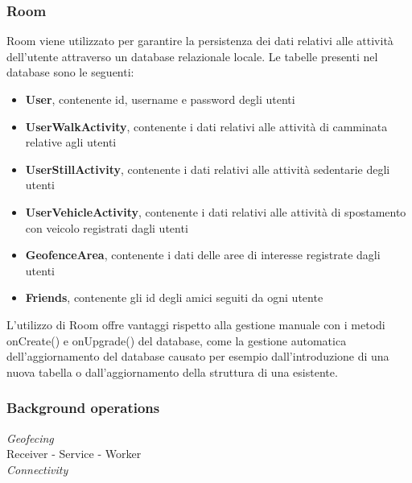 \documentclass{article}
\begin{document}
\subsubsection*{Room}
Room viene utilizzato per garantire la persistenza dei dati relativi alle attività dell'utente attraverso un database relazionale locale. Le tabelle presenti nel database sono le seguenti:
\begin{itemize}
    \renewcommand{\labelitemi}{-}
    \item \textbf{User}, contenente id, username e password degli utenti
    \item \textbf{UserWalkActivity}, contenente i dati relativi alle attività di camminata relative agli utenti
    \item \textbf{UserStillActivity}, contenente i dati relativi alle attività sedentarie degli utenti
    \item \textbf{UserVehicleActivity}, contenente i dati relativi alle attività di spostamento con veicolo registrati dagli utenti
    \item \textbf{GeofenceArea}, contenente i dati delle aree di interesse registrate dagli utenti
    \item \textbf{Friends}, contenente gli id degli amici seguiti da ogni utente
\end{itemize}
L'utilizzo di Room offre vantaggi rispetto alla gestione manuale con i metodi onCreate() e onUpgrade() del database, come la gestione automatica dell'aggiornamento del database causato per esempio dall'introduzione di una nuova tabella o dall'aggiornamento della struttura di una esistente.
\subsubsection*{Background operations}
\textit{Geofecing} \\
Receiver - Service - Worker \\
\textit{Connectivity} \\
\end{document}
